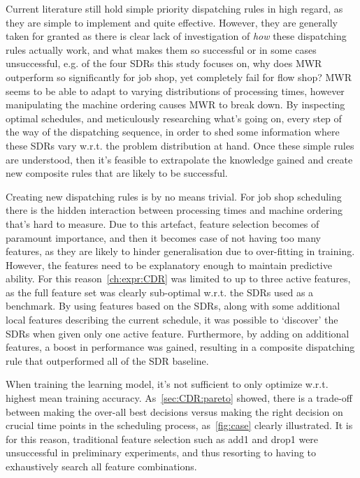\documentclass[smallextended]{svjour3}
\begin{document}
Current literature still hold simple priority dispatching rules in high regard, as they are simple to implement and quite effective. However, they are generally taken for granted as there is clear lack of investigation of \emph{how} these dispatching rules actually work, and what makes them so successful or in some cases unsuccessful, e.g. of the four SDRs this study focuses on, why does MWR outperform so significantly for job shop, yet completely fail for flow shop? MWR seems to be able to adapt to varying distributions of processing times, however manipulating the machine ordering causes MWR to break down. By inspecting optimal schedules, and meticulously researching what's going on, every step of the way of the dispatching sequence, in order to shed some information where these SDRs vary w.r.t. the problem distribution at hand. Once these simple rules are understood, then it's feasible to extrapolate the knowledge gained and create new composite rules that are likely to be successful. 

Creating new dispatching rules is by no means trivial. For job shop scheduling there is the hidden interaction between processing times and machine ordering that's hard to measure. Due to this artefact, feature selection becomes of paramount importance, and then it becomes case of not having too many features, as they are likely to hinder generalisation due to over-fitting in training. However, the features need to be explanatory enough to maintain predictive ability. For this reason~\cref{ch:expr:CDR} was limited to up to three active features, as the full feature set was clearly sub-optimal w.r.t. the SDRs used as a benchmark. By using features based on the SDRs, along with some additional local features describing the current schedule, it was possible to `discover' the SDRs when given only one active feature. %
Furthermore, by adding on additional features, a boost in performance was gained, resulting in a composite dispatching rule that outperformed all of the SDR baseline. 

When training the learning model, it's not sufficient to only optimize w.r.t. highest mean training accuracy. As~\cref{sec:CDR:pareto} showed, there is a trade-off between making the over-all best decisions versus making the right decision on crucial time points in the scheduling process, as~\cref{fig:case} clearly illustrated. It is for this reason, traditional feature selection such as add1 and drop1 were unsuccessful in preliminary experiments, and thus resorting to having to exhaustively search all feature combinations.



  

\end{document}
